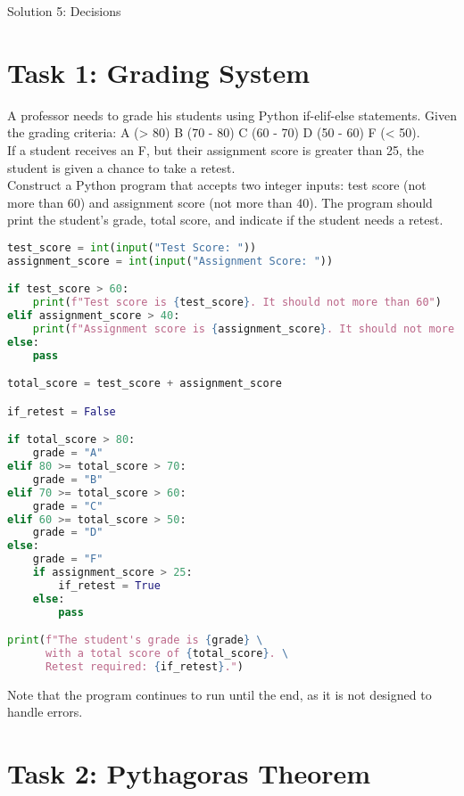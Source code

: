\documentclass[11pt]{article}
\begin{document}
\begin{center}
    \Large{Solution 5: Decisions}
\end{center}

\section*{Task 1: Grading System}
A professor needs to grade his students using Python if-elif-else statements.
Given the grading criteria: A (> 80) B (70 - 80) C (60 - 70) D (50 - 60) F (< 50).\\
If a student receives an F, but their assignment score is greater than 25, the student is given a chance to take a retest.\\

\noindent
Construct a Python program that accepts two integer inputs: test score (not more than 60) and assignment score (not more than 40). The program should print the student's grade, total score, and indicate if the student needs a retest.

\begin{lstlisting}[language=Python]
test_score = int(input("Test Score: "))
assignment_score = int(input("Assignment Score: "))

if test_score > 60: 
    print(f"Test score is {test_score}. It should not more than 60")
elif assignment_score > 40: 
    print(f"Assignment score is {assignment_score}. It should not more than 40")
else:
    pass

total_score = test_score + assignment_score

if_retest = False

if total_score > 80:
    grade = "A"
elif 80 >= total_score > 70:
    grade = "B"
elif 70 >= total_score > 60:
    grade = "C"
elif 60 >= total_score > 50:
    grade = "D"
else:
    grade = "F"
    if assignment_score > 25:
        if_retest = True
    else:
        pass

print(f"The student's grade is {grade} \
      with a total score of {total_score}. \
      Retest required: {if_retest}.")
\end{lstlisting}

\noindent
Note that the program continues to run until the end, as it is not designed to handle errors.

\clearpage
\section*{Task 2: Pythagoras Theorem}
\end{document}

